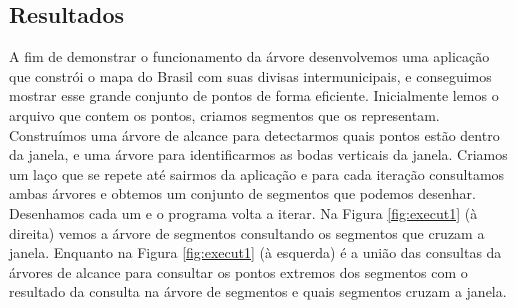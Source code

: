 \subsection{Resultados}
A fim de demonstrar o funcionamento da árvore desenvolvemos uma aplicação que constrói o mapa do Brasil com suas divisas intermunicipais, e conseguimos mostrar esse grande conjunto de pontos de forma eficiente.
Inicialmente lemos o arquivo que contem os pontos, criamos segmentos que os representam. Construímos uma árvore de alcance para detectarmos quais pontos estão dentro da janela, e uma árvore para identificarmos as bodas verticais da janela. Criamos um laço que se repete até sairmos da aplicação e para cada iteração consultamos ambas árvores e obtemos um conjunto de segmentos que podemos desenhar. Desenhamos cada um e o programa volta a iterar. Na Figura \ref{fig:execut1} (à direita) vemos a árvore de segmentos consultando os segmentos que cruzam a janela. Enquanto na Figura \ref{fig:execut1} (à esquerda) é a união das consultas da árvores de alcance para consultar os pontos extremos dos segmentos com o resultado da consulta na árvore de segmentos e quais segmentos cruzam a janela.

